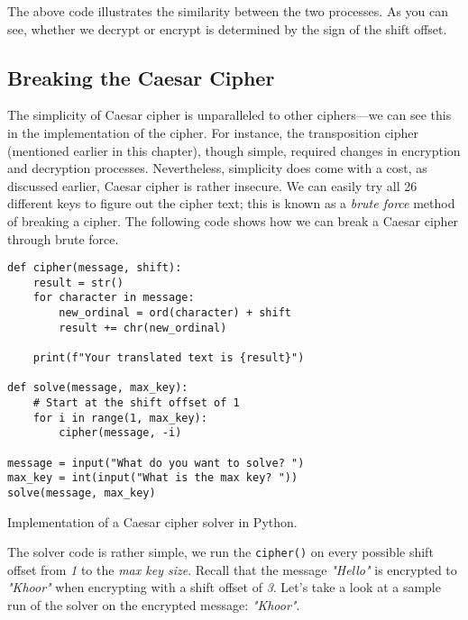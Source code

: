 The above code illustrates the similarity between the two processes. As you can see, whether we decrypt or encrypt is 
determined by the sign of the shift offset.

\subsection{Breaking the Caesar Cipher}

The simplicity of Caesar cipher is unparalleled to other ciphers---we can see this in the implementation of the cipher.
For instance, the transposition cipher (mentioned earlier in this chapter), though simple, required changes in encryption and
decryption processes. Nevertheless, simplicity does come with a cost, as discussed earlier, Caesar cipher is rather insecure. 
We can easily try all 26 different keys to figure out the cipher text; this is known as a \textit{brute force} method
of breaking a cipher. The following code shows how we can break a Caesar cipher through brute force. 

\begin{listing}[H]
    \begin{verbatim}
def cipher(message, shift):
    result = str()
    for character in message:
        new_ordinal = ord(character) + shift
        result += chr(new_ordinal)
        
    print(f"Your translated text is {result}")
    
def solve(message, max_key):
    # Start at the shift offset of 1
    for i in range(1, max_key):
        cipher(message, -i)
    
message = input("What do you want to solve? ")
max_key = int(input("What is the max key? "))
solve(message, max_key)  
    \end{verbatim}
    \caption{Implementation of a Caesar cipher solver in Python.}
\end{listing}

The solver code is rather simple, we run the \texttt{cipher()} on every possible shift offset from \textit{1}
to the \textit{max key size}. Recall that the message \textit{"Hello"} is encrypted to \textit{"Khoor"} when encrypting with a 
shift offset of \textit{3}. Let's take a look at a sample run of the solver on the encrypted message: \textit{"Khoor"}.

\newcommand{\reducedstrut}{\vrule width 0pt height .9\ht\strutbox depth .9\dp\strutbox\relax}
\newcommand{\yellow}[1]{%
  \begingroup
  \setlength{\fboxsep}{0pt}%
  \colorbox{yellow}{\reducedstrut#1\/}%
  \endgroup
}

